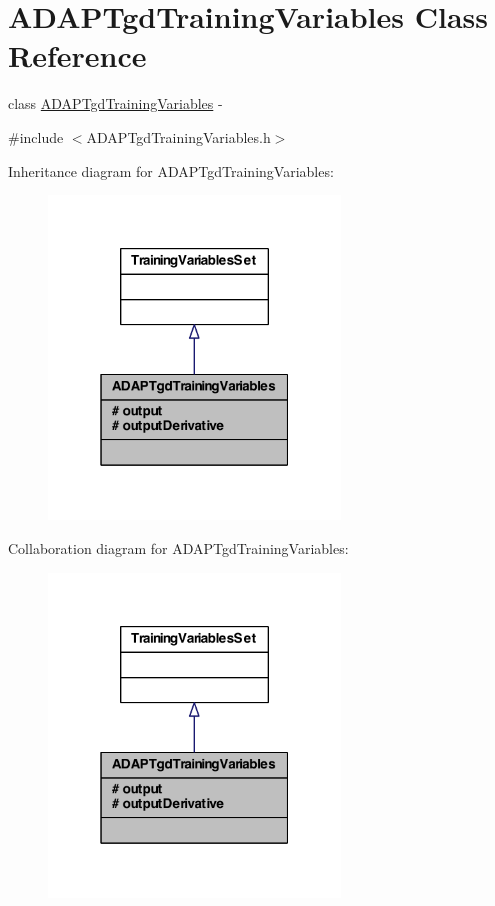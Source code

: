 \hypertarget{class_a_d_a_p_tgd_training_variables}{
\section{ADAPTgdTrainingVariables Class Reference}
\label{class_a_d_a_p_tgd_training_variables}
}


class \hyperlink{class_a_d_a_p_tgd_training_variables}{ADAPTgdTrainingVariables} -\/  




{\ttfamily \#include $<$ADAPTgdTrainingVariables.h$>$}



Inheritance diagram for ADAPTgdTrainingVariables:\nopagebreak
\begin{figure}[H]
\begin{center}
\leavevmode
\includegraphics[width=220pt]{class_a_d_a_p_tgd_training_variables__inherit__graph}
\end{center}
\end{figure}


Collaboration diagram for ADAPTgdTrainingVariables:\nopagebreak
\begin{figure}[H]
\begin{center}
\leavevmode
\includegraphics[width=220pt]{class_a_d_a_p_tgd_training_variables__coll__graph}
\end{center}
\end{figure}
